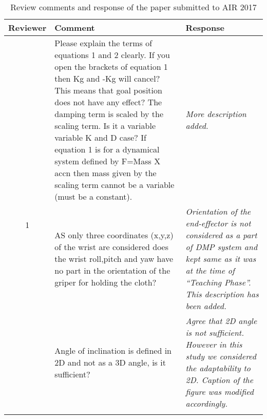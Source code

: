 \documentclass{article}
\begin{document}
\begin{table}
	\centering
	\caption{Review comments and response of the paper submitted to AIR 2017}
	\begin{tabular}{ |c|p{9cm}|p{5cm}| }
		\hline
		\textbf{Reviewer}  & \textbf{Comment}                                                                                                                                                                                                                                                                                                                                                                                                           & \textbf{Response}                                                                                                                           \\ \hline\hline
		\multirow{4}{*}{1} & Please explain the terms of equations 1 and 2 clearly. If you open the brackets of equation 1 then Kg and -Kg will cancel? This means that goal position does not have any effect? The damping term is scaled by the scaling term. Is it a variable variable K and D case? If equation 1 is for a dynamical system defined by F=Mass X accn then mass given by the scaling term cannot be a variable (must be a constant). & \textit{More description added.}                                                                                                            \\ \cline{2-3}
		                   & AS only three coordinates (x,y,z) of the wrist are considered does the wrist roll,pitch and yaw have no part in the orientation of the griper for holding the cloth?                                                                                                                                                                                                                                                       & \textit{Orientation of the end-effector is not considered as a part of DMP system and                                                       
		kept same as it was at the time of ``Teaching Phase''. This description has been added.}  \\ \cline{2-3}
		                   & Angle of inclination is defined in 2D and not as a 3D angle, is it sufficient?                                                                                                                                                                                                                                                                                                                                             & \textit{Agree that 2D angle is not sufficient. However in this study we considered the adaptability to 2D. Caption of the figure was modified accordingly.}                                                                                                            \\ \cline{2-3}

\end{tabular}
\end{table}
\end{document}
